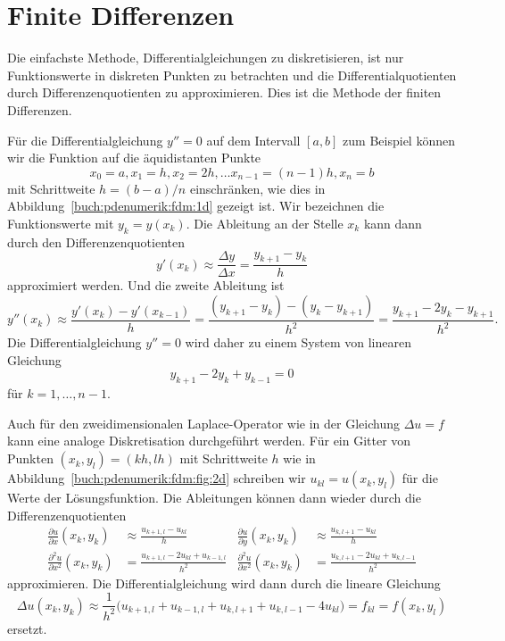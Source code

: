 %
%
\section{Finite Differenzen
\label{buch:pdenumerik:section:fdm}}
Die einfachste Methode, Differentialgleichungen zu diskretisieren,
ist nur Funktionswerte in diskreten Punkten zu betrachten und die
Differentialquotienten durch Differenzenquotienten zu approximieren.
Dies ist die Methode der finiten Differenzen.
%
%

Für die Differentialgleichung $y''=0$ auf dem Intervall $[a,b]$
zum Beispiel können wir die Funktion auf die äquidistanten Punkte
%
\[
x_0=a,
x_1=h,
x_2=2h,
\dots
x_{n-1}=(n-1)h,
x_n=b
\]
mit Schrittweite $h = (b-a)/n$ einschränken, wie dies in
Abbildung~\ref{buch:pdenumerik:fdm:1d} gezeigt ist.
Wir bezeichnen die Funktionswerte mit $y_k = y(x_k)$.
Die Ableitung an der Stelle $x_k$ kann dann durch den Differenzenquotienten
\[
y'(x_k)
\approx
\frac{\Delta y}{\Delta x}
=
\frac{y_{k+1}-y_k}{h}
\]
approximiert werden.
Und die zweite Ableitung ist
\[
y''(x_k)
\approx
\frac{y'(x_k) - y'(x_{k-1})}{h}
=
\frac{(y_{k+1}-y_{k})-(y_k-y_{k+1})}{h^2}
=
\frac{y_{k+1}-2y_{k}-y_{k+1}}{h^2}.
\]
Die Differentialgleichung $y''=0$ wird daher zu einem System von
linearen Gleichung
\[
y_{k+1} - 2y_k + y_{k-1} = 0
\]
für $k=1,\dots,n-1$.

Auch für den zweidimensionalen Laplace-Operator wie in der Gleichung
$\Delta u = f$ kann eine analoge Diskretisation durchgeführt
werden.
%
Für ein Gitter von Punkten $(x_k,y_l) = (kh,lh)$ mit Schrittweite $h$
wie in Abbildung~\ref{buch:pdenumerik:fdm:fig:2d}
schreiben wir $u_{kl}=u(x_k,y_l)$ für die Werte der Lösungsfunktion.
Die Ableitungen können dann wieder durch die Differenzenquotienten
\begin{align*}
\frac{\partial u}{\partial x}(x_k,y_k)
&\approx
\frac{u_{k+1,l}-u_{kl}}{h}
&
\frac{\partial u}{\partial y}(x_k,y_k)
&\approx
\frac{u_{k,l+1}-u_{kl}}{h}
\\
\frac{\partial^2 u}{\partial x^2}(x_k,y_k)
&=
\frac{u_{k+1,l}-2u_{kl}+u_{k-1,l}}{h^2}
&
\frac{\partial^2 u}{\partial x^2}(x_k,y_k)
&=
\frac{u_{k,l+1}-2u_{kl}+u_{k,l-1}}{h^2}
\end{align*}
approximieren.
Die Differentialgleichung wird dann durch die lineare Gleichung
\[
\Delta u(x_k,y_k)
\approx
\frac{1}{h^2}
\bigl(
u_{k+1,l}+u_{k-1,l}+u_{k,l+1}+u_{k,l-1} - 4 u_{kl}
\bigr)
=
f_{kl} = f(x_k,y_l)
\]
ersetzt.


